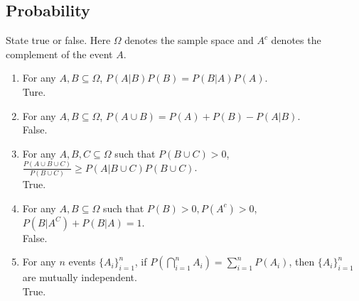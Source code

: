 \documentclass[a4paper]{article}
\theoremstyle{definition}
\newenvironment{soln}{
    \leavevmode\color{blue}\ignorespaces
}{}
\begin{document}
\subsection{Probability}
State true or false. Here $\Omega$ denotes the sample space and $A^c$ denotes the complement of the event $A$.
\begin{enumerate}
\item For any $A, B \subseteq \Omega$, $P(A|B)P(B) = P(B|A)P(A)$.\\
  \begin{soln}  Ture. \end{soln}
\item For any $A, B \subseteq \Omega$, $P(A \cup B) = P(A) + P(B) - P(A | B)$.\\         
  \begin{soln}  False. \end{soln}
\item For any $A, B, C \subseteq \Omega$ such that $P(B \cup C) > 0$,
  $\frac{P(A \cup B \cup C)}{P(B \cup C)} \geq P(A | B \cup C) P(B \cup C)$.\\ \begin{soln} True. \end{soln}
\item For any $A, B\subseteq\Omega$ such that $P(B) > 0, P(A^c) > 0$,
  $P(B|A^C) + P(B|A) = 1$.\\ 
  \begin{soln}  False. \end{soln}
\item For any $n$ events $\{A_i\}_{i=1}^n$, if
  $P(\bigcap_{i=1}^n A_i) = \sum_{i=1}^n P(A_i)$, then
  $\{A_i\}_{i=1}^n$ are mutually independent.\\
  \begin{soln}  True. \end{soln}
\end{enumerate}
\end{document}
